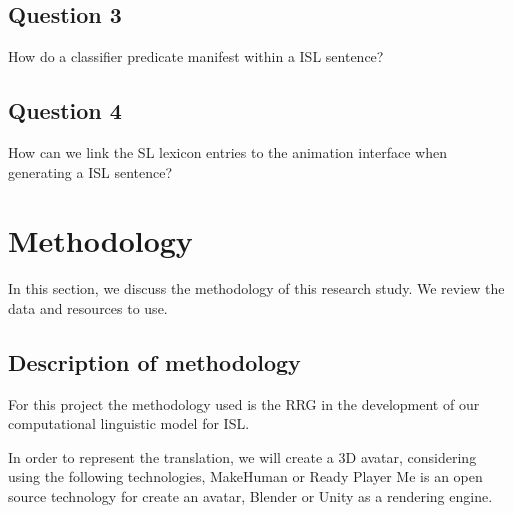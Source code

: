\subsection{Question 3}
How do a classifier predicate manifest within a ISL sentence?

\subsection{Question 4}
How can we link the SL lexicon entries to the animation interface when generating a ISL sentence?

\newpage

\section{Methodology}

In this section, we discuss the methodology of this research study. We review the data and resources to use.

\subsection{Description of methodology}

For this project the methodology used is the RRG in the development of our
computational linguistic model for ISL. 

In order to represent the translation, we will create a 3D avatar, considering using the following technologies, MakeHuman or Ready Player Me is an open source technology for create an avatar, Blender or Unity as a rendering engine. 

\newpage



\newpage

